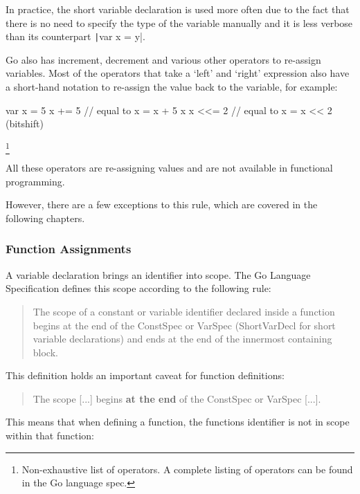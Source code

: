 In practice, the short variable declaration is used more often due to the
fact that there is no need to specify the type of the variable manually and
it is less verbose than its counterpart \texttt|var x = y|.

Go also has increment, decrement and various other operators to re-assign
variables. Most of the operators that take a `left' and `right' expression
also have a short-hand notation to re-assign the value back to the variable,
for example:

\begin{code}
\begin{gocode}
var x = 5
x += 5 // equal to x = x + 5
x %
x <<= 2 // equal to x = x << 2 (bitshift)
\end{gocode}
\end{code}\footnote{Non-exhaustive list of operators. A complete listing
of operators can be found in the Go language spec\autocite{spec-operators}.}

All these operators are re-assigning values and are not available in functional
programming.

However, there are a few exceptions to this rule, which are covered in the
following chapters.

\subsubsection{Function Assignments}\label{sec:func-reassign}

A variable declaration brings an identifier into scope. The Go Language Specification
defines this scope according to the following rule:
\begin{quote}
    The scope of a constant or variable identifier declared inside a function begins
    at the end of the ConstSpec or VarSpec (ShortVarDecl for short variable
    declarations) and ends at the end of the innermost containing block.
\autocite{spec-scope}\end{quote}

This definition holds an important caveat for function definitions:
\begin{quote}
    The scope [...] begins \textbf{at the end} of the ConstSpec or VarSpec [...].
\end{quote}

This means that when defining a function, the functions identifier is not
in scope within that function:

